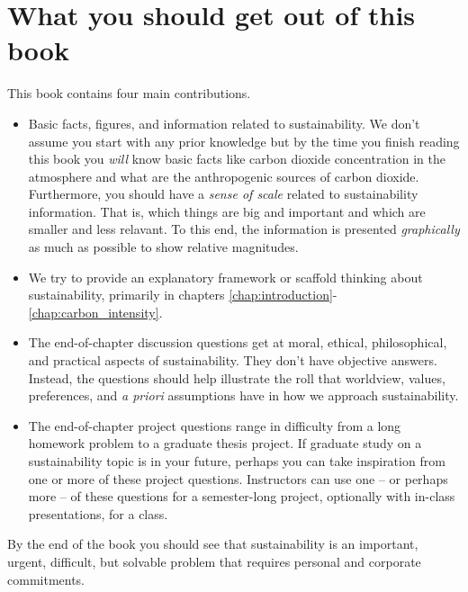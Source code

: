 {\section*{What you should get out of this book} 
This book contains four main contributions.
\begin{itemize}
\item Basic facts, figures, and information related to sustainability. 
We don't assume you start with any prior knowledge but by the time you finish 
reading this book you \emph{will} know basic facts like carbon dioxide 
concentration in the atmosphere and what are the anthropogenic sources of 
carbon dioxide. 
Furthermore, you should have a \emph{sense of scale} related to sustainability 
information. 
That is, which things are big and important and which are smaller and less relavant. 
To this end, the information is presented \emph{graphically} as much as possible 
to show relative magnitudes.
\item We try to provide an explanatory framework or scaffold thinking about sustainability,
primarily in chapters \ref{chap:introduction}-\ref{chap:carbon_intensity}.
\item The end-of-chapter discussion questions get at moral, ethical, philosophical,
and practical aspects of sustainability. They don't have %
objective answers. 
Instead, the questions should help illustrate the roll that worldview, values, 
preferences, and \emph{a priori} assumptions have in how we approach sustainability. 
\item The end-of-chapter project questions range in difficulty from a long
homework problem to a graduate thesis project. If graduate study on a sustainability
topic is in your future, perhaps you can take inspiration from one or more of 
these project questions. Instructors can use one -- or perhaps more -- of these 
questions for a semester-long project, optionally with in-class presentations, for a class.
\end{itemize}
By the end of the book you should see that sustainability is an important, 
urgent, difficult, but solvable problem that requires personal and corporate 
commitments. \\

}
